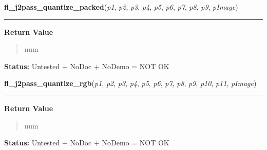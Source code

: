     \label{xformslib:flflimage:fl_j2pass_quantize_packed}

    \vspace{0.5ex}

\hspace{.8\funcindent}\begin{boxedminipage}{\funcwidth}

    \raggedright \textbf{fl\_j2pass\_quantize\_packed}(\textit{p1}, \textit{p2}, \textit{p3}, \textit{p4}, \textit{p5}, \textit{p6}, \textit{p7}, \textit{p8}, \textit{p9}, \textit{pImage})

    \vspace{-1.5ex}

    \rule{\textwidth}{0.5\fboxrule}
\setlength{\parskip}{2ex}
\setlength{\parskip}{1ex}
      \textbf{Return Value}
    \vspace{-1ex}

      \begin{quote}
      num

      \end{quote}

\textbf{Status:} Untested + NoDoc + NoDemo = NOT OK



    \end{boxedminipage}

    \label{xformslib:flflimage:fl_j2pass_quantize_rgb}

    \vspace{0.5ex}

\hspace{.8\funcindent}\begin{boxedminipage}{\funcwidth}

    \raggedright \textbf{fl\_j2pass\_quantize\_rgb}(\textit{p1}, \textit{p2}, \textit{p3}, \textit{p4}, \textit{p5}, \textit{p6}, \textit{p7}, \textit{p8}, \textit{p9}, \textit{p10}, \textit{p11}, \textit{pImage})

    \vspace{-1.5ex}

    \rule{\textwidth}{0.5\fboxrule}
\setlength{\parskip}{2ex}
\setlength{\parskip}{1ex}
      \textbf{Return Value}
    \vspace{-1ex}

      \begin{quote}
      num

      \end{quote}

\textbf{Status:} Untested + NoDoc + NoDemo = NOT OK



    \end{boxedminipage}

